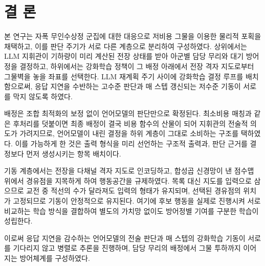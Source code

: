 \documentclass[10pt,twocolumn]{extarticle}
\begin{document}
\section{결 론}

본 연구는 자폭 무인수상정 군집에 대한 대응으로 저비용 그물을 이용한 물리적 포획을
채택하고, 이를 판단 주기가 서로 다른 계층으로 분리하여 구성하였다. 상위에서는 LLM
지휘관이 기하량이 미리 계산된 전장 상태를 받아 아군별 담당 무리와 대기 방어정을 결정하고,
하위에서는 강화학습 정책이 그 배정 아래에서 전장 격자 지도로부터 그물벽을 놓을 좌표를
선택한다. LLM 재계획 주기 사이에 강화학습 결정 루프를 배치함으로써, 응답 지연을 수반하는
고수준 판단과 매 스텝 갱신되는 저수준 기동이 서로를 막지 않도록 하였다.

배정은 조합 최적화의 보정 없이 언어모델의 판단만으로 확정된다. 최소비용 매칭과 같은
후처리를 덧붙이면 최종 배정이 결국 비용 함수의 산물이 되어 지휘관의 전술적 의도가
가려지므로, 언어모델이 내린 결정을 하위 계층이 그대로 소비하는 구조를 택하였다. 이를
가능하게 한 것은 출력 형식을 미리 선언하는 구조적 출력과, 판단 근거를 결정보다 먼저
생성시키는 항목 배치이다.

기동 계층에서는 전장을 다채널 격자 지도로 인코딩하고, 합성곱 신경망이 낸 점수맵 위에서
경유점을 지목하게 하여 행동공간을 규제하였다. 목록 대신 지도를 입력으로 삼으므로 교전 중
적선의 수가 달라져도 입력의 형태가 유지되며, 선택된 경유점의 위치가 고정되므로 기동이
안정적으로 유지된다. 여기에 후보 행동을 실제로 진행시켜 서로 비교하는 학습 방식을 결합하여
별도의 가치망 없이도 방어정별 기여를 구분한 학습이 성립한다.

이로써 응답 지연을 감수하는 언어모델의 전술 판단과 매 스텝의 강화학습 기동이 서로를
기다리지 않고 병렬로 추론을 진행하며, 담당 무리의 배정에서 그물 투하까지 이어지는 방어체계를 구성하였다.
\end{document}
